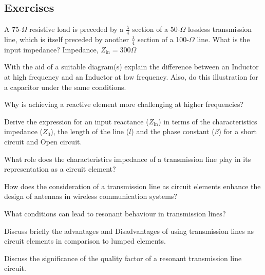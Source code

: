 \begin{mdframed}[ backgroundcolor=lightblue, linewidth=1pt, hidealllines=true]
\section*{Exercises}
\begin{ExerciseList}
\Exercise[label={ex101}]
A 75-$\varOmega$ resistive load is preceded by a $\frac{\lambda}{4}$ section of a 50-$\varOmega$ lossless transmission line, which is itself preceded by another $\frac{\lambda}{4}$ section of a 100-$\varOmega$ line. What is the input impedance?
\Answer[ref={ex101}]
Impedance, $Z_{\text{in}} = 300\varOmega$

\Exercise[label={ex102}]
With the aid of a suitable diagram(s) explain the difference between an Inductor at high frequency and an Inductor at low frequency. Also, do this illustration for a capacitor under the same conditions.

\Exercise[label={ex103}]
Why is achieving a reactive element more challenging at higher frequencies?

\Exercise[label={ex105}]
Derive the expression for an input reactance ($Z_{\text{in}}$) in terms of the characteristics impedance ($Z_0$), the length of the line ($l$) and the phase constant ($\beta$) for a short circuit and Open circuit.

\Exercise[label={ex106}]
What role does the characteristics impedance of a transmission line play in its representation as a circuit element?

\Exercise[label={ex107}]
How does the consideration of a transmission line as circuit elements enhance the design of antennas in wireless communication systems?

\Exercise[label={ex108}]
What conditions can lead to resonant behaviour in transmission lines?

\Exercise[label={ex109}]
Discuss briefly the advantages and Disadvantages of using transmission lines as circuit elements in comparison to lumped elements.

\Exercise[label={ex1010}]
Discuss the significance of the quality factor of a resonant transmission line circuit.
\end{ExerciseList}
\end{mdframed}
